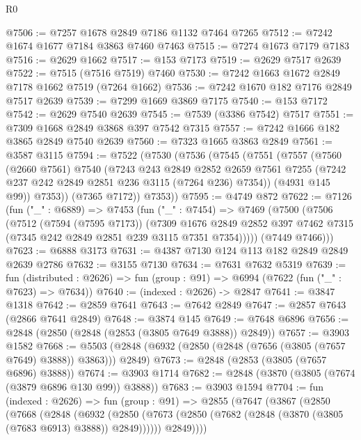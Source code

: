 \begin{lexlean}{R0}
\begin{coremodule}
@7506 := @7257 @1678 @2849 @7186 @1132 @7464 @7265
@7512 := @7242 @1674 @1677 @7184 @3863 @7460 @7463
@7515 := @7274 @1673 @7179 @7183
@7516 := @2629 @1662
@7517 := @153 @7173
@7519 := @2629 @7517 @2639
@7522 := @7515 (@7516 @7519) @7460
@7530 := @7242 @1663 @1672 @2849 @7178 @1662 @7519 (@7264 @1662)
@7536 := @7242 @1670 @182 @7176 @2849 @7517 @2639
@7539 := @7299 @1669 @3869 @7175
@7540 := @153 @7172
@7542 := @2629 @7540 @2639
@7545 := @7539 (@3386 @7542) @7517
@7551 := @7309 @1668 @2849 @3868 @397 @7542 @7315
@7557 := @7242 @1666 @182 @3865 @2849 @7540 @2639
@7560 := @7323 @1665 @3863 @2849
@7561 := @3587 @3115
@7594 := @7522
    (@7530
      (@7536
        (@7545
          (@7551
            (@7557
              (@7560
                (@2660 @7561)
                @7540
                (@7243
                  @243
                  @2849
                  @2852
                  @2659
                  @7561
                  @7255
                  (@7242 @237 @242 @2849 @2851 @236 @3115 (@7264 @236) @7354))
                (@4931 @145 @99))
              @7353))
          (@7365 @7172))
        @7353))
@7595 := @4749 @872
@7622 := @7126
    (fun ("_" : @6889) =>
    @7453
      (fun ("_" : @7454) =>
      @7469
        (@7500
          (@7506
            (@7512
              (@7594 (@7595 @7173))
              (@7309
                @1676
                @2849
                @2852
                @397
                @7462
                @7315
                (@7345 @242 @2849 @2851 @239 @3115 @7351 @7354)))))
        (@7449 @7466)))
@7623 := @6888 @3173
@7631 := @4387 @7130 @124 @113 @182 @2849 @2849 @2639 @2786
@7632 := @3155 @7130
@7634 := @7631 @7632 @5319
@7639 := fun (distributed : @2626) =>
  fun (group : @91) => @6994 (@7622 (fun ("_" : @7623) => @7634))
@7640 := (indexed : @2626) -> @2847
@7641 := @3847 @1318
@7642 := @2859 @7641
@7643 := @7642 @2849
@7647 := @2857 @7643 (@2866 @7641 @2849)
@7648 := @3874 @145
@7649 := @7648 @6896
@7656 := @2848 (@2850 (@2848 (@2853 (@3805 @7649 @3888)) @2849))
@7657 := @3903 @1582
@7668 := @5503 (@2848 (@6932 (@2850 (@2848 (@7656 (@3805 (@7657 @7649) @3888)) @3863))) @2849)
@7673 := @2848 (@2853 (@3805 (@7657 @6896) @3888))
@7674 := @3903 @1714
@7682 := @2848 (@3870 (@3805 (@7674 (@3879 @6896 @130 @99)) @3888))
@7683 := @3903 @1594
@7704 := fun (indexed : @2626) =>
  fun (group : @91) =>
  @2855
    (@7647
      (@3867
        (@2850
          (@7668
            (@2848
              (@6932
                (@2850 (@7673 (@2850 (@7682 (@2848 (@3870 (@3805 (@7683 @6913) @3888)) @2849))))))
              @2849))))

\end{coremodule}
\end{lexlean}
